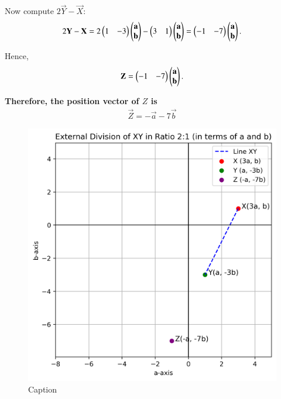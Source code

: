 \documentclass[journal]{IEEEtran}
\begin{document}
Now compute $2\vec{Y} - \vec{X}$:
\begin{align}
2\mathbf{Y} - \mathbf{X} = 
2\begin{pmatrix}1 & -3\end{pmatrix}
       \begin{pmatrix}\mathbf{a} \\ \mathbf{b}\end{pmatrix}
-
\begin{pmatrix}3 & 1\end{pmatrix}
      \begin{pmatrix}\mathbf{a} \\ \mathbf{b}\end{pmatrix}
=
\begin{pmatrix}-1 & -7\end{pmatrix}
     \begin{pmatrix}\mathbf{a} \\ \mathbf{b}\end{pmatrix}.
\end{align}

Hence,
\begin{align}
\mathbf{Z} = 
\begin{pmatrix}-1 & -7\end{pmatrix}
\begin{pmatrix}\mathbf{a} \\ \mathbf{b}\end{pmatrix}
.
\end{align}

\noindent
\textbf{Therefore, the position vector of $Z$ is}
\begin{align}
\boxed{\vec{Z} = 
-\vec{a}-7\vec{b}}
\end{align}


\begin{figure}[h!]
    \centering
    \includegraphics[width=0.8\linewidth]{figs/01.png}
    \caption{Caption}
    \label{fig:placeholder}
\end{figure}
\end{document}
